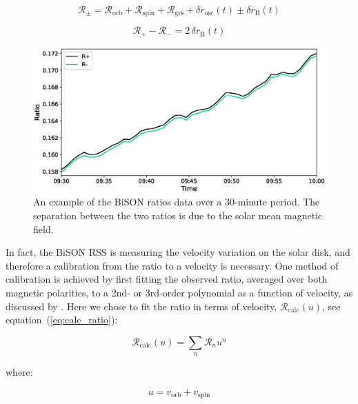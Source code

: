 \begin{equation}
\mathcal{R}_{\pm} = \mathcal{R}_{\mathrm{orb}} + \mathcal{R}_{\mathrm{spin}} + \mathcal{R}_{\mathrm{grs}} + \delta {r}_{\mathrm{osc}}(t) \pm \delta {r}_{\mathrm{B}}(t)
\label{eq:vel_comp}
\end{equation}

\begin{equation}
\mathcal{R}_{+} - \mathcal{R}_{-} = 2 \, \delta {r}_{\mathrm{B}}(t)
\label{eq:R_diff}
\end{equation}

\begin{figure}[ht!]
	\includegraphics[width=\columnwidth]{Fred_ratio_zoom.eps}
	\caption{An example of the BiSON ratios data over a 30-minute period. The separation between the two ratios is due to the solar mean magnetic field.}
	\label{fig:ratio_split}
\end{figure}

In fact, the BiSON RSS is measuring the velocity variation on the solar disk, and therefore a calibration from the ratio to a velocity is necessary. One method of calibration is achieved by first fitting the observed ratio, averaged over both magnetic polarities, to a 2nd- or 3rd-order polynomial as a function of velocity, as discussed by \citet{elsworth_techniques_1995}. Here we chose to fit the ratio in terms of velocity, $\mathcal{R}_{\mathrm{calc}}(u)$, see equation~(\ref{eq:calc_ratio}):

\begin{equation}
\mathcal{R}_{\mathrm{calc}}(u) = \sum_{n} \mathcal{R}_{n} u^n
\label{eq:calc_ratio}
\end{equation}

where:

\begin{equation}
u = v_{\mathrm{orb}} + v_{\mathrm{spin}}
\label{eq:stn_vel}
\end{equation}

